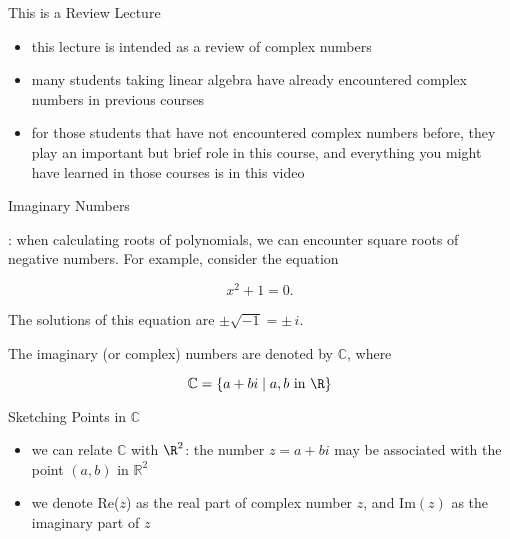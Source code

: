 \begin{frame}{This is a Review Lecture}

    \begin{itemize}
        \item<2-> this lecture is intended as a review of complex numbers
    \item<3-> many students taking linear algebra have already encountered complex numbers in previous courses
    \item<4-> for those students that have not encountered complex numbers before, they play an important but brief role in this course, and everything you might have learned in those courses is in this video
    \end{itemize}


\end{frame}


\begin{frame}{Imaginary Numbers}

    : when calculating roots of polynomials, we can encounter square roots of negative numbers. For example, consider the equation

    \[ x^2+1 = 0 .\]

    The solutions of this equation are $\pm \sqrt{-1} = \pm \, i$.
    
    \vspace{12pt}
    \pause 
    
    The imaginary (or complex) numbers are denoted by $\mathbb C$, where 

    \[ \mathbb C = \{a+bi \mid a,b \text{ in  } \R \} \]


\end{frame}



\begin{frame}{Sketching Points in $\mathbb C$}

    \begin{itemize}
        \item<2-> we can relate $\mathbb C$ with $\R^2$: the number $z=a+bi$ may be associated with the point $(a,b)$ in $\mathbb R^2$ 
        \item<3-> we denote Re($z$) as the real part of complex number $z$, and Im$(z)$ as the imaginary part of $z$ 
    \end{itemize}
    
\end{frame}



